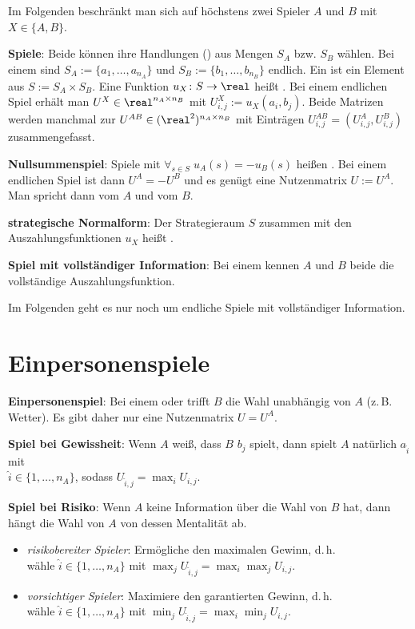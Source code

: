 Im Folgenden beschränkt man sich auf höchstens zwei Spieler $A$ und $B$
mit $X \in \{A, B\}$.

\textbf{Spiele}:
Beide können ihre Handlungen () aus Mengen $S_A$ bzw. $S_B$ wählen.
Bei einem  sind $S_A := \{a_1, \dotsc, a_{n_A}\}$ und
$S_B := \{b_1, \dotsc, b_{n_B}\}$ endlich.
Ein  ist ein Element aus $S := S_A \times S_B$.
Eine Funktion $u_X\colon S \to \real$ heißt .
Bei einem endlichen Spiel erhält man 
$U^X \in \real^{n_A \times n_B}$ mit
$U_{i,j}^X := u_X(a_i, b_j)$.
Beide Matrizen werden manchmal zur 
$U^{AB} \in (\real^2)^{n_A \times n_B}$ mit Einträgen $U_{i,j}^{AB} = (U_{i,j}^A, U_{i,j}^B)$
zusammengefasst.

\textbf{Nullsummenspiel}:
Spiele mit $\forall_{s \in S}\; u_A(s) = -u_B(s)$ heißen .
Bei einem endlichen Spiel ist dann $U^A = -U^B$ und es genügt eine Nutzenmatrix $U := U^A$.
Man spricht dann vom  $A$ und vom  $B$.

\textbf{strategische Normalform}:
Der Strategieraum $S$ zusammen mit den Auszahlungsfunktionen $u_X$ heißt
.

\textbf{Spiel mit vollständiger Information}:
Bei einem  kennen $A$ und $B$ beide die
vollständige Auszahlungsfunktion.

Im Folgenden geht es nur noch um endliche Spiele mit vollständiger Information.

\pagebreak

\section{%
    Einpersonenspiele%
}

\textbf{Einpersonenspiel}:
Bei einem  oder  trifft
$B$ die Wahl unabhängig von $A$ (z.\,B. Wetter).
Es gibt daher nur eine Nutzenmatrix $U = U^A$.

\textbf{Spiel bei Gewissheit}:
Wenn $A$ weiß, dass $B$ $b_j$ spielt, dann spielt $A$ natürlich $a_{\widehat{i}}$ mit\\
$\widehat{i} \in \{1, \dotsc, n_A\}$, sodass $U_{\widehat{i},j} = \max_i U_{i,j}$.

\textbf{Spiel bei Risiko}:
Wenn $A$ keine Information über die Wahl von $B$ hat, dann hängt die Wahl von $A$ von dessen
Mentalität ab.
\begin{itemize}
    \item
    \emph{risikobereiter Spieler}:
    Ermögliche den maximalen Gewinn, d.\,h.\\
    wähle $\widehat{i} \in \{1, \dotsc, n_A\}$
    mit $\max_j U_{\widehat{i},j} = \max_i \max_j U_{i,j}$.

    \item
    \emph{vorsichtiger Spieler}:
    Maximiere den garantierten Gewinn, d.\,h.\\
    wähle $\widehat{i} \in \{1, \dotsc, n_A\}$
    mit $\min_j U_{\widehat{i},j} = \max_i \min_j U_{i,j}$.
\end{itemize}

